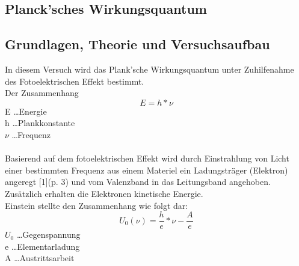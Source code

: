 \documentclass[12pt,a4paper]{article}
\begin{document}
\begin{multicols}{2}




%			



\section{Planck'sches Wirkungsquantum}

\subsection{Grundlagen, Theorie und Versuchsaufbau}

In diesem Versuch wird das Plank'sche Wirkungsquantum unter Zuhilfenahme des Fotoelektrischen Effekt bestimmt.\\
Der Zusammenhang
$$E = h * \nu$$
E \ldots Energie \\
h \ldots Plankkonstante \\ 
$\nu$ \ldots Frequenz \\
\\
Basierend auf dem fotoelektrischen Effekt wird durch Einstrahlung von Licht einer bestimmten Frequenz aus einem Materiel ein Ladungsträger (Elektron) angeregt [1](p. 3) und vom Valenzband in das Leitungsband angehoben. Zusätzlich erhalten die Elektronen kinetische Energie.\\
Einstein stellte den Zusammenhang wie folgt dar:
$$U_0(\nu) = \frac{h}{e} * \nu - \frac{A}{e}$$
$U_0$ \ldots Gegenspannung\\
e \ldots Elementarladung\\
A \ldots Austrittsarbeit\\


\end{multicols}
\end{document}
